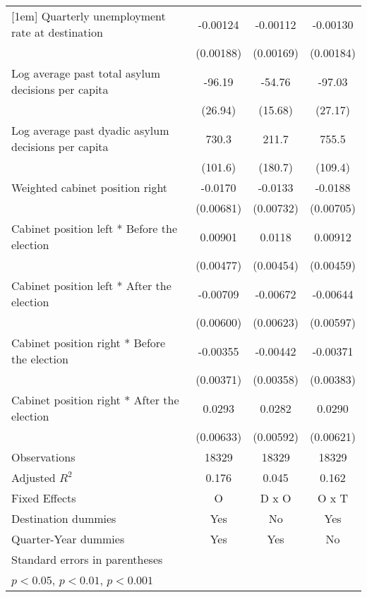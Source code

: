 \begin{table}[htbp]
\begin{tabular}{l*{3}{c}}
[1em]
Quarterly unemployment rate at destination&    -0.00124         &    -0.00112         &    -0.00130         \\
                    &   (0.00188)         &   (0.00169)         &   (0.00184)         \\
[1em]
Log average past total asylum decisions per capita&      -96.19\sym{***}&      -54.76\sym{**} &      -97.03\sym{***}\\
                    &     (26.94)         &     (15.68)         &     (27.17)         \\
[1em]
Log average past dyadic asylum decisions per capita&       730.3\sym{***}&       211.7         &       755.5\sym{***}\\
                    &     (101.6)         &     (180.7)         &     (109.4)         \\
[1em]
Weighted cabinet position right&     -0.0170\sym{*}  &     -0.0133         &     -0.0188\sym{*}  \\
                    &   (0.00681)         &   (0.00732)         &   (0.00705)         \\
[1em]
Cabinet position left * Before the election&     0.00901         &      0.0118\sym{*}  &     0.00912         \\
                    &   (0.00477)         &   (0.00454)         &   (0.00459)         \\
[1em]
Cabinet position left * After the election&    -0.00709         &    -0.00672         &    -0.00644         \\
                    &   (0.00600)         &   (0.00623)         &   (0.00597)         \\
[1em]
Cabinet position right * Before the election&    -0.00355         &    -0.00442         &    -0.00371         \\
                    &   (0.00371)         &   (0.00358)         &   (0.00383)         \\
[1em]
Cabinet position right * After the election&      0.0293\sym{***}&      0.0282\sym{***}&      0.0290\sym{***}\\
                    &   (0.00633)         &   (0.00592)         &   (0.00621)         \\
\hline
Observations        &       18329         &       18329         &       18329         \\
Adjusted \(R^{2}\)  &       0.176         &       0.045         &       0.162         \\
Fixed Effects       &           O         &       D x O         &       O x T         \\
Destination dummies &         Yes         &          No         &         Yes         \\
Quarter-Year dummies&         Yes         &         Yes         &          No         \\
\hline\hline
\multicolumn{4}{l}{\footnotesize Standard errors in parentheses}\\
\multicolumn{4}{l}{\footnotesize \sym{*} \(p<0.05\), \sym{**} \(p<0.01\), \sym{***} \(p<0.001\)}\\
\end{tabular}
\end{table}
